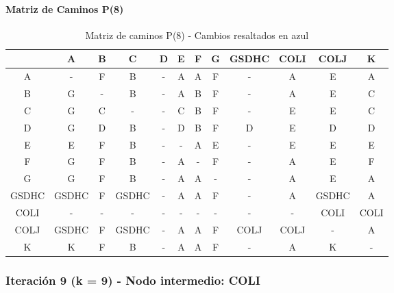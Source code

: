 \documentclass[12pt]{article}
\begin{document}
\paragraph{Matriz de Caminos P(8)}
\begin{table}[h!]
\centering
\begin{tabular}{|c|c|c|c|c|c|c|c|c|c|c|c|}
\hline
 & A & B & C & D & E & F & G & GSDHC & COLI & COLJ & K \\\hline
A & - & F & B & - & A & A & F & - & A & E & A \\\hline
B & G & - & B & - & A & B & F & - & A & E & C \\\hline
C & G & C & - & - & C & B & F & - & E & E & C \\\hline
D & G & D & B & - & D & B & F & D & E & D & D \\\hline
E & E & F & B & - & - & A & E & - & E & E & E \\\hline
F & G & F & B & - & A & - & F & - & A & E & F \\\hline
G & G & F & B & - & A & A & - & - & A & E & A \\\hline
GSDHC & GSDHC & F & GSDHC & - & A & A & F & - & A & GSDHC & A \\\hline
COLI & - & - & - & - & - & - & - & - & - & COLI & COLI \\\hline
COLJ & \cellcolor{lightblue} GSDHC & \cellcolor{lightblue} F & \cellcolor{lightblue} GSDHC & - & A & \cellcolor{lightblue} A & F & COLJ & COLJ & - & \cellcolor{lightblue} A \\\hline
K & K & F & B & - & A & A & F & - & A & K & - \\\hline
\end{tabular}
\caption{Matriz de caminos P(8) - Cambios resaltados en azul}
\end{table}

\subsubsection{Iteración 9 (k = 9) - Nodo intermedio: COLI}
\end{document}
